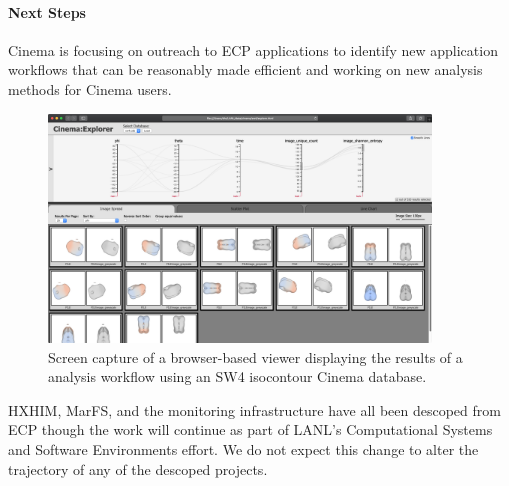 \paragraph{Next Steps}
Cinema is focusing on outreach to ECP applications to identify new application workflows that can be reasonably made efficient and working on new analysis methods for Cinema users.

\begin{figure}[htb]
	\centering
	\includegraphics[width=4in]{projects/2.3.6-NNSA/2.3.6.01-LANL-ATDM/cinema-sw4-example.png}
	\caption{
		Screen capture of a browser-based viewer displaying the results of a analysis workflow using an SW4 isocontour Cinema database.  
	\label{fig:cinema-sw4example}
	}
\end{figure}

HXHIM, MarFS, and the monitoring infrastructure have all been descoped
from ECP though the work will continue as part of LANL's Computational Systems
and Software Environments effort. We do not expect this change to alter the
trajectory of any of the descoped projects.
